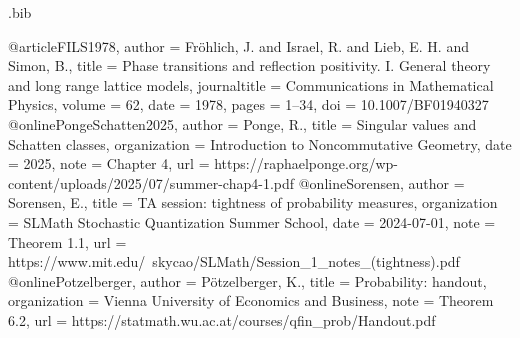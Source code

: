 \begin{filecontents*}[overwrite]{\jobname.bib}

@article{FILS1978,
  author = {Fr\"ohlich, J. and Israel, R. and Lieb, E. H. and Simon, B.},
  title = {Phase transitions and reflection positivity.
    {I}. General theory and long range lattice models},
  journaltitle = {Communications in Mathematical Physics},
  volume = {62}, date = {1978}, pages = {1--34},
  doi = {10.1007/BF01940327}
}
@online{PongeSchatten2025,
  author = {Ponge, R.},
  title = {Singular values and {Schatten} classes},
  organization = {Introduction to Noncommutative Geometry},
  date = {2025}, note = {Chapter 4},
  url = {https://raphaelponge.org/wp-content/uploads/2025/07/summer-chap4-1.pdf}
}
@online{Sorensen,
  author = {Sorensen, E.},
  title = {{TA} session: tightness of probability measures},
  organization = {SLMath Stochastic Quantization Summer School},
  date = {2024-07-01}, note = {Theorem 1.1},
  url = {https://www.mit.edu/~skycao/SLMath/Session_1_notes_(tightness).pdf}
}
@online{Potzelberger,
  author = {P\"otzelberger, K.}, title = {Probability: handout},
  organization = {Vienna University of Economics and Business},
  note = {Theorem 6.2},
  url = {https://statmath.wu.ac.at/courses/qfin_prob/Handout.pdf}
}
\end{filecontents*}
\documentclass[11pt,letterpaper,reqno]{amsart}
\makeatletter
{}[2020/10/01]

\RequirePackage[T1]{fontenc}
\RequirePackage{lmodern}
\RequirePackage{microtype}
\RequirePackage[letterpaper,margin=1in,headheight=15pt]{geometry}
\RequirePackage{amsmath,amsthm,amssymb,mathtools}
\RequirePackage{enumitem}
\RequirePackage{perpage}
\RequirePackage{xcolor}
\RequirePackage[breaklinks=true,colorlinks=true,
  linkcolor=manuscriptred,citecolor=manuscriptblue,urlcolor=manuscriptmagenta]{hyperref}
\RequirePackage{cleveref}

\setcounter{tocdepth}{1}
\renewcommand{\thefigure}{\Roman{figure}}
\renewcommand{\thetable}{\Roman{table}}
\renewcommand{\thefootnote}{%
  \ifnum\value{footnote}>9\arabic{footnote}\else\fnsymbol{footnote}\fi}

